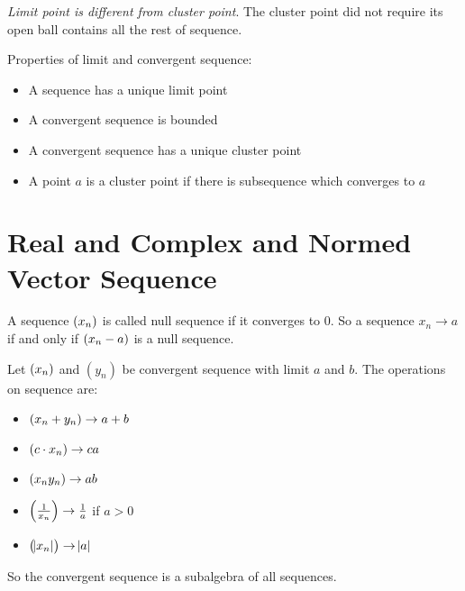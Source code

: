 \emph{Limit point is different from cluster point}. The cluster point did not require its open ball contains all the rest of sequence.


\begin{theorem}\label{property_of_limit}
    Properties of limit and convergent sequence:
    \begin{itemize}
        \item A sequence has a unique limit point
        \item A convergent sequence is bounded
        \item A convergent sequence has a unique cluster point
        \item A point $a$ is a cluster point if there is subsequence which converges to $a$
    \end{itemize}
\end{theorem}





%
%
%
%

\section{Real and Complex and Normed Vector Sequence}

\begin{definition}
    A sequence $\sequence{x_n}$ is called null sequence if it converges to $0$. So a sequence $x_n \rightarrow a$ if and only if $\sequence{x_n - a}$ is a null sequence.
\end{definition}

\begin{theorem}
    Let $\sequence{x_n}$ and $(y_n)$ be convergent sequence with limit $a$ and $b$. The operations on sequence are:
    \begin{itemize}
        \item $\sequence{x_n + y_n} \rightarrow a + b$
        \item $\sequence{c \cdot x_n} \rightarrow c a$
        \item $\sequence{x_n y_n} \rightarrow ab$
        \item $\intoo{\frac{1}{x_n}} \rightarrow \frac{1}{a}$ if $a > 0$
        \item $\sequence{\absolutevalue{x_n}} \rightarrow \absolutevalue{a}$
    \end{itemize}
    
    So the convergent sequence is a subalgebra of all sequences.
\end{theorem}

